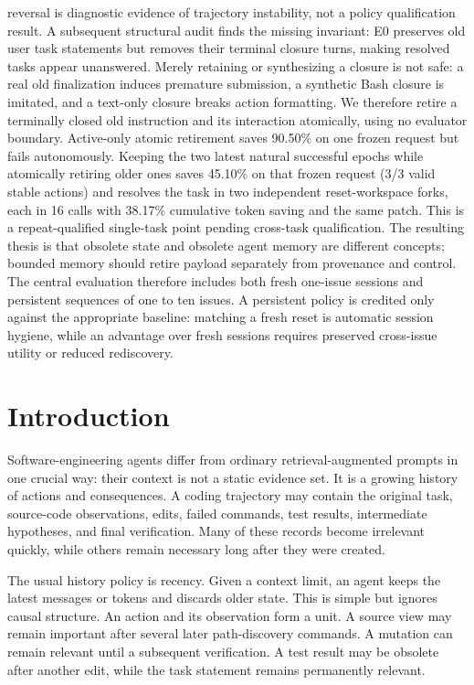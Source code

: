 \documentclass[11pt]{article}
\begin{document}
reversal is diagnostic evidence of trajectory instability, not a policy
qualification result.
A subsequent structural audit finds the missing invariant: E0 preserves old
user task statements but removes their terminal closure turns, making resolved
tasks appear unanswered.  Merely retaining or synthesizing a closure is not
safe: a real old finalization induces premature submission, a synthetic Bash
closure is imitated, and a text-only closure breaks action formatting.  We
therefore retire a terminally closed old instruction and its interaction
atomically, using no evaluator boundary.  Active-only atomic retirement saves
90.50\% on one frozen request but fails autonomously.  Keeping the two latest
natural successful epochs while atomically retiring older ones saves 45.10\%
on that frozen request (3/3 valid stable actions) and resolves the task in two
independent reset-workspace forks, each in 16 calls with 38.17\% cumulative
token saving and the same patch.  This is a repeat-qualified single-task point
pending cross-task qualification.
The resulting thesis is that obsolete state and obsolete agent memory are
different concepts; bounded memory should retire payload separately from
provenance and control.  The central evaluation therefore includes both fresh
one-issue sessions and persistent sequences of one to ten issues.  A
persistent policy is credited only against the appropriate baseline: matching
a fresh reset is automatic session hygiene, while an advantage over fresh
sessions requires preserved cross-issue utility or reduced rediscovery.
\fi

\section{Introduction}

Software-engineering agents differ from ordinary retrieval-augmented prompts in
one crucial way: their context is not a static evidence set. It is a growing
history of actions and consequences. A coding trajectory may contain the
original task, source-code observations, edits, failed commands, test results,
intermediate hypotheses, and final verification. Many of these records become
irrelevant quickly, while others remain necessary long after they were created.

The usual history policy is recency. Given a context limit, an agent keeps the
latest messages or tokens and discards older state. This is simple but ignores
causal structure. An action and its observation form a unit. A source view may
remain important after several later path-discovery commands. A mutation can
remain relevant until a subsequent verification. A test result may be obsolete
after another edit, while the task statement remains permanently relevant.
\end{document}
